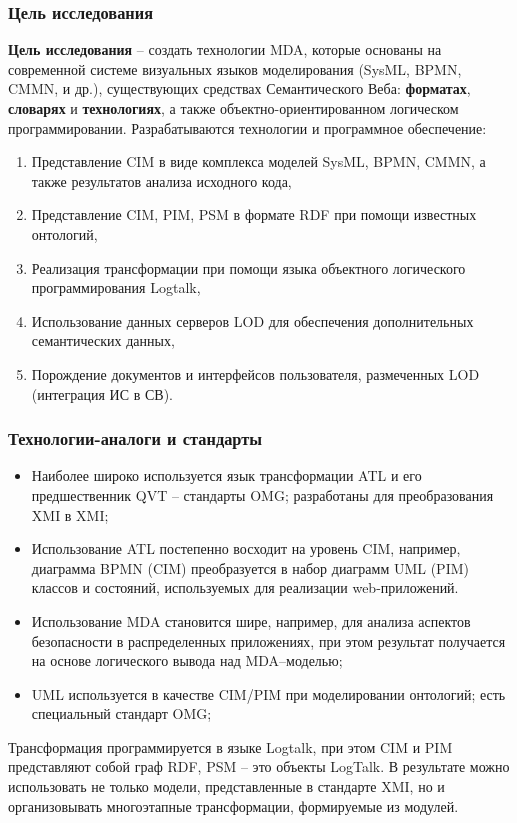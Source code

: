 \documentclass[10pt]{beamer}
\begin{document}
\begin{frame} \frametitle{Цель исследования} \textbf{Цель исследования} -- создать технологии MDA, которые основаны на современной системе визуальных языков моделирования (SysML, BPMN, CMMN, и др.), существующих средствах Семантического Веба: \textbf{форматах}, \textbf{словарях} и \textbf{технологиях}, а также объектно-ориентированном логическом программировании. Разрабатываются технологии и программное обеспечение: \begin{enumerate} \item Представление CIM в виде комплекса моделей SysML, BPMN, CMMN, а также результатов анализа исходного кода, \item Представление CIM, PIM, PSM в формате RDF при помощи известных онтологий, \item Реализация трансформации при помощи языка объектного логического программирования Logtalk, \item Использование данных серверов LOD для обеспечения дополнительных семантических данных, \item Порождение документов и интерфейсов пользователя, размеченных LOD (интеграция ИС в СВ). \end{enumerate} \end{frame} \begin{frame} \frametitle{Технологии-аналоги и стандарты} \begin{itemize} \item Наиболее широко используется язык трансформации ATL и его предшественник QVT -- стандарты OMG; разработаны для преобразования XMI в XMI; \item Использование ATL постепенно восходит на уровень CIM, например, диаграмма BPMN (CIM) преобразуется в набор диаграмм UML (PIM) классов и состояний, используемых для реализации web-приложений. \item Использование MDA становится шире, например, для анализа аспектов безопасности в распределенных приложениях, при этом результат получается на основе логического вывода над MDA--моделью;
  \item UML используется в качестве CIM/PIM при моделировании онтологий; есть специальный стандарт OMG; %
  \end{itemize}

  Трансформация программируется в языке Logtalk, при этом CIM и PIM представляют собой граф RDF, PSM -- это объекты LogTalk. В результате можно использовать не только модели, представленные в стандарте XMI, но и организовывать многоэтапные трансформации, формируемые из модулей. \end{frame}
\end{document}
